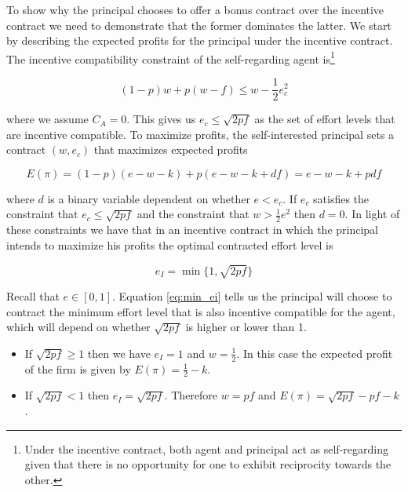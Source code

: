 \documentclass[12pt]{article}
\begin{document}
To show why the principal chooses to offer a bonus contract over the incentive contract we need to demonstrate that the former dominates the latter. We start by describing the expected profits for the principal under the incentive contract. The incentive compatibility constraint of the self-regarding agent is\footnote{Under the incentive contract, both agent and principal act as self-regarding given that there is no opportunity for one to exhibit reciprocity towards the other.}  

\begin{equation}
	\left(1-p\right) w + p \left(w-f\right) \leq w - \frac{1}{2}e^2_c
\end{equation}

\noindent
where we assume $C_A = 0$. This gives us $e_c \leq \sqrt{2pf}$ as the set of effort levels that are incentive compatible. To maximize profits, the self-interested principal sets a contract $\left(w,e_c\right)$ that maximizes expected profits

\begin{equation}
	E\left(\pi\right) = \left(1-p\right)\left(e-w-k\right)+p\left(e-w-k+df\right) = e-w-k+pdf
\end{equation}

\noindent
where $d$ is a binary variable dependent on whether $e<e_c$. If $e_c$ satisfies the constraint that $e_c \leq \sqrt{2pf}$ and the constraint that $w > \frac{1}{2} e^2$ then $d=0$. In light of these constraints we have that in an incentive contract in which the principal intends to maximize his profits the optimal contracted effort level is 

\begin{equation}\label{eq:min_ei}
	e_I = \min\{1,\sqrt{2pf}\}
\end{equation}

Recall that $e \in [0,1]$. Equation \eqref{eq:min_ei} tells us the principal will choose to contract the minimum effort level that is also incentive compatible for the agent, which will depend on whether $\sqrt{2pf}$ is higher or lower than 1.
\begin{itemize}
\item If $\sqrt{2pf} \geq 1$ then we have $e_I = 1$ and $w=\frac{1}{2}$. In this case the expected profit of the firm is given by $E\left(\pi\right) = \frac{1}{2} - k$.
\item If $\sqrt{2pf} < 1$ then $e_I = \sqrt{2pf}$. Therefore $w=pf$ and $E\left(\pi\right) = \sqrt{2pf} - pf - k$. 
\end{itemize}
 
\end{document}
